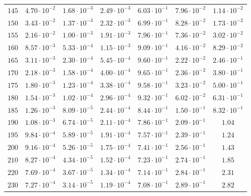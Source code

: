 \begin{table}
\begin{tabular}{ccccccc}
$145 $&$ 4.70\cdot 10^{-2}  $&$ 1.68\cdot 10^{-3}  $&$ 2.49\cdot 10^{-3}  $&$ 6.03\cdot 10^{-1}  $&$ 7.96\cdot 10^{-2}  $&$ 1.14\cdot 10^{-2}  $\\
$150 $&$ 3.43\cdot 10^{-2}  $&$ 1.37\cdot 10^{-3}  $&$ 2.32\cdot 10^{-3}  $&$ 6.99\cdot 10^{-1}  $&$ 8.28\cdot 10^{-2}  $&$ 1.73\cdot 10^{-2}  $\\
$155 $&$ 2.16\cdot 10^{-2}  $&$ 1.00\cdot 10^{-3}  $&$ 1.91\cdot 10^{-3}  $&$ 7.96\cdot 10^{-1}  $&$ 7.36\cdot 10^{-2}  $&$ 3.02\cdot 10^{-2}  $\\
$160 $&$ 8.57\cdot 10^{-3}  $&$ 5.33\cdot 10^{-4}  $&$ 1.15\cdot 10^{-3}  $&$ 9.09\cdot 10^{-1}  $&$ 4.16\cdot 10^{-2}  $&$ 8.29\cdot 10^{-2}  $\\
$165 $&$ 3.11\cdot 10^{-3}  $&$ 2.30\cdot 10^{-4}  $&$ 5.45\cdot 10^{-4}  $&$ 9.60\cdot 10^{-1}  $&$ 2.22\cdot 10^{-2}  $&$ 2.46\cdot 10^{-1}  $\\
$170 $&$ 2.18\cdot 10^{-3}  $&$ 1.58\cdot 10^{-4}  $&$ 4.00\cdot 10^{-4}  $&$ 9.65\cdot 10^{-1}  $&$ 2.36\cdot 10^{-2}  $&$ 3.80\cdot 10^{-1}  $\\
$175 $&$ 1.80\cdot 10^{-3}  $&$ 1.23\cdot 10^{-4}  $&$ 3.38\cdot 10^{-4}  $&$ 9.58\cdot 10^{-1}  $&$ 3.23\cdot 10^{-2}  $&$ 5.00\cdot 10^{-1}  $\\
$180 $&$ 1.54\cdot 10^{-3}  $&$ 1.02\cdot 10^{-4}  $&$ 2.96\cdot 10^{-4}  $&$ 9.32\cdot 10^{-1}  $&$ 6.02\cdot 10^{-2}  $&$ 6.31\cdot 10^{-1}  $\\
$185 $&$ 1.26\cdot 10^{-3}  $&$ 8.09\cdot 10^{-5}  $&$ 2.44\cdot 10^{-4}  $&$ 8.44\cdot 10^{-1}  $&$ 1.50\cdot 10^{-1}  $&$ 8.32\cdot 10^{-1}  $\\
$190 $&$ 1.08\cdot 10^{-3}  $&$ 6.74\cdot 10^{-5}  $&$ 2.11\cdot 10^{-4}  $&$ 7.86\cdot 10^{-1}  $&$ 2.09\cdot 10^{-1}  $&$ 1.04 $\\
$195 $&$ 9.84\cdot 10^{-4}  $&$ 5.89\cdot 10^{-5}  $&$ 1.91\cdot 10^{-4}  $&$ 7.57\cdot 10^{-1}  $&$ 2.39\cdot 10^{-1}  $&$ 1.24 $\\
$200 $&$ 9.16\cdot 10^{-4}  $&$ 5.26\cdot 10^{-5}  $&$ 1.75\cdot 10^{-4}  $&$ 7.41\cdot 10^{-1}  $&$ 2.56\cdot 10^{-1}  $&$ 1.43 $\\
$210 $&$ 8.27\cdot 10^{-4}  $&$ 4.34\cdot 10^{-5}  $&$ 1.52\cdot 10^{-4}  $&$ 7.23\cdot 10^{-1}  $&$ 2.74\cdot 10^{-1}  $&$ 1.85 $\\
$220 $&$ 7.69\cdot 10^{-4}  $&$ 3.67\cdot 10^{-5}  $&$ 1.34\cdot 10^{-4}  $&$ 7.14\cdot 10^{-1}  $&$ 2.84\cdot 10^{-1}  $&$ 2.31 $\\
$230 $&$ 7.27\cdot 10^{-4}  $&$ 3.14\cdot 10^{-5}  $&$ 1.19\cdot 10^{-4}  $&$ 7.08\cdot 10^{-1}  $&$ 2.89\cdot 10^{-1}  $&$ 2.82 $\\

\end{tabular}
\end{table}

